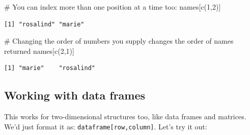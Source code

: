 \documentclass[
  letterpaper,
  DIV=11,
  numbers=noendperiod]{scrreprt}
\newenvironment{Shaded}{\begin{snugshade}}{\end{snugshade}}
\newcommand{\CommentTok}[1]{\textcolor[rgb]{0.37,0.37,0.37}{#1}}
\newcommand{\DecValTok}[1]{\textcolor[rgb]{0.68,0.00,0.00}{#1}}
\newcommand{\FunctionTok}[1]{\textcolor[rgb]{0.28,0.35,0.67}{#1}}
\newcommand{\NormalTok}[1]{\textcolor[rgb]{0.00,0.23,0.31}{#1}}
\begin{document}
\begin{Shaded}
\begin{Highlighting}[]
\CommentTok{\# You can index more than one position at a time too:}
\NormalTok{names[}\FunctionTok{c}\NormalTok{(}\DecValTok{1}\NormalTok{,}\DecValTok{2}\NormalTok{)]}
\end{Highlighting}
\end{Shaded}

\begin{verbatim}
[1] "rosalind" "marie"   
\end{verbatim}

\begin{Shaded}
\begin{Highlighting}[]
\CommentTok{\# Changing the order of numbers you supply changes the order of names returned}
\NormalTok{names[}\FunctionTok{c}\NormalTok{(}\DecValTok{2}\NormalTok{,}\DecValTok{1}\NormalTok{)]}
\end{Highlighting}
\end{Shaded}

\begin{verbatim}
[1] "marie"    "rosalind"
\end{verbatim}

\subsection{Working with data frames}\label{working-with-data-frames}

This works for two-dimensional structures too, like data frames and
matrices. We'd just format it as: \texttt{dataframe{[}row,column{]}}.
Let's try it out:
\end{document}
